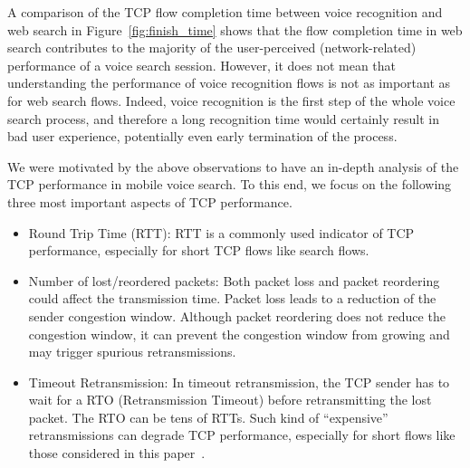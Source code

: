 A comparison of the TCP flow completion time between voice recognition and web search in Figure~\ref{fig:finish_time} shows that the flow completion time in web search contributes to the majority of the user-perceived (network-related) performance of a voice search session. However, it does not mean that understanding the performance of voice recognition flows is not as important as for web search flows. Indeed, voice recognition is the first step of the whole voice search process, and therefore a long recognition time would certainly result in bad user experience, potentially even early termination of the process.



We were motivated by the above observations to have an in-depth analysis of the TCP performance in mobile voice search. To this end, we focus on the following three most important aspects of TCP performance.

\begin{itemize}
	\item {Round Trip Time (RTT):} RTT is a commonly used indicator of TCP performance, especially for short TCP flows like search flows.
	
	\item {Number of lost/reordered packets:} Both packet loss and packet reordering could affect the transmission time. Packet loss leads to a reduction of the sender congestion window. Although packet reordering does not reduce the congestion window, it can prevent the congestion window from growing and may trigger spurious retransmissions.
	
	\item {Timeout Retransmission:} In timeout retransmission, the TCP sender has to wait for a RTO (Retransmission Timeout) before retransmitting the lost packet. The RTO can be tens of RTTs. Such kind of ``expensive'' retransmissions can degrade TCP performance, especially for short flows like those considered in this paper~\cite{flach2013reducing}.

\end{itemize}

